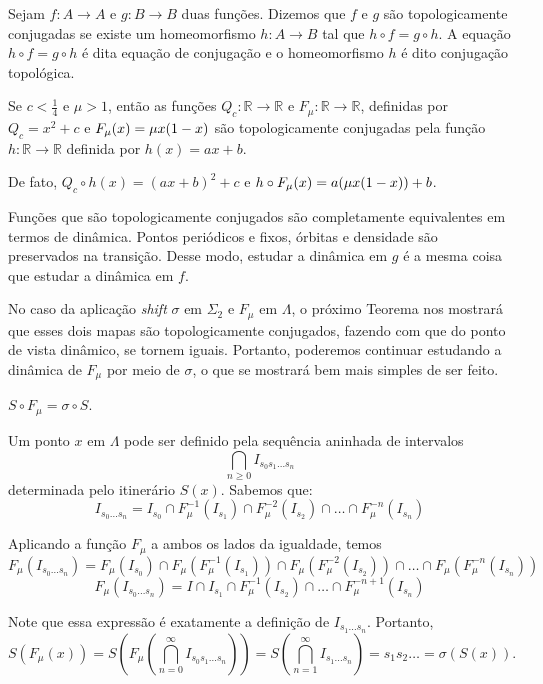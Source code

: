 \documentclass[../IC.tex]{subfiles}
\begin{document}
	\begin{definicao}
		Sejam $f: A \rightarrow A$ e $g: B \rightarrow B$ duas funções. Dizemos que $f$ e $g$ são topologicamente conjugadas se existe um homeomorfismo $h: A \rightarrow B$ tal que $h \circ f = g \circ h$. A equação $h \circ f = g \circ h$ é dita equação de conjugação e o homeomorfismo $h$ é dito conjugação topológica.
	\end{definicao}
	
	\begin{exemplo}
		Se $c<\frac{1}{4}$ e $\mu>1$, então as funções $Q_c:\mathbb{R}\to\mathbb{R}$ e $F_\mu:\mathbb{R}\to\mathbb{R}$, definidas por $Q_c = x^2 + c$ e $F_\mu(x)=\mu\/x(1-x)$ são topologicamente conjugadas pela função $h:\mathbb{R}\to\mathbb{R}$ definida por $h(x)=ax+b$.
		
		De fato, $Q_c \circ h(x)=(ax+b)^2+c$ e $h \circ F_\mu(x)=a(\mu\/x(1-x))+b$.
	\end{exemplo}
	
	Funções que são topologicamente conjugados são completamente equivalentes em termos de dinâmica. Pontos periódicos e fixos, órbitas e densidade são preservados na transição. Desse modo, estudar a dinâmica em $g$ é a mesma coisa que estudar a dinâmica em $f$.
	
	\vspace{-\baselineskip}
	No caso da aplicação \textit{shift} $\sigma$ em $\Sigma_2$ e $F_\mu$ em $\Lambda$, o próximo Teorema nos mostrará que esses dois mapas são topologicamente conjugados, fazendo com que do ponto de vista dinâmico, se tornem iguais. Portanto, poderemos continuar estudando a dinâmica de $F_\mu$ por meio de $\sigma$, o que se mostrará bem mais simples de ser feito.
	
	\begin{teorema}
		$S \circ F_\mu = \sigma \circ S$.
	\end{teorema}
	
	\begin{prova}
		Um ponto $x$ em $\Lambda$ pode ser definido pela sequência aninhada de intervalos
		$$ \bigcap_{n \ge 0} I_{s_0 s_1 \dots s_n} $$
		determinada pelo itinerário $S(x)$. Sabemos que:
		$$ I_{s_0 \dots s_n} = I_{s_0} \cap F_\mu^{-1}(I_{s_1}) \cap F_\mu^{-2}(I_{s_2}) \cap \dots \cap F_\mu^{-n}(I_{s_n}) $$
		
		Aplicando a função $F_\mu$ a ambos os lados da igualdade, temos
		$$ F_\mu(I_{s_0 \dots s_n}) = F_\mu(I_{s_0}) \cap F_\mu(F_\mu^{-1}(I_{s_1})) \cap F_\mu(F_\mu^{-2}(I_{s_2})) \cap \dots \cap F_\mu(F_\mu^{-n}(I_{s_n})) $$
		$$ F_\mu(I_{s_0 \dots s_n}) = I \cap I_{s_1} \cap F_\mu^{-1}(I_{s_2}) \cap \dots \cap F_\mu^{-n+1}(I_{s_n}) $$
		
		Note que essa expressão é exatamente a definição de $I_{s_1 \dots s_n}$. Portanto, 
		$$ S(F_\mu(x)) = S \left( F_\mu \left( \bigcap_{n=0}^{\infty} I_{s_0 s_1 \dots s_n} \right) \right) = S \left( \bigcap_{n=1}^{\infty} I_{s_1 \dots s_n} \right) = s_1 s_2 \dots = \sigma(S(x)). $$
	\end{prova}
	
\end{document}
